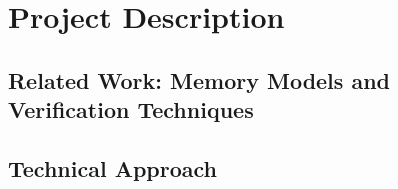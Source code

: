 
\setcounter{page}{1}


\section{Project Description \mytitle}






\subsection{Related Work: Memory Models and Verification Techniques}
\label{sec-existing}



\subsection{Technical Approach}
\label{sec-extension}




